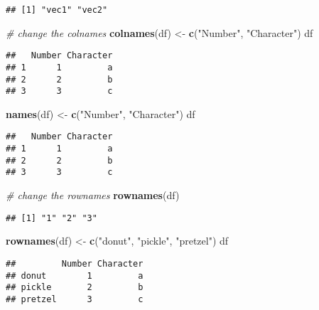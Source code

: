 \documentclass[
]{book}
\newenvironment{Shaded}{\begin{snugshade}}{\end{snugshade}}
\newcommand{\CommentTok}[1]{\textcolor[rgb]{0.56,0.35,0.01}{\textit{#1}}}
\newcommand{\KeywordTok}[1]{\textcolor[rgb]{0.13,0.29,0.53}{\textbf{#1}}}
\newcommand{\NormalTok}[1]{#1}
\newcommand{\StringTok}[1]{\textcolor[rgb]{0.31,0.60,0.02}{#1}}
\begin{document}
\begin{verbatim}
## [1] "vec1" "vec2"
\end{verbatim}

\begin{Shaded}
\begin{Highlighting}[]
\CommentTok{\# change the colnames}
\KeywordTok{colnames}\NormalTok{(df) \textless{}{-}}\StringTok{ }\KeywordTok{c}\NormalTok{(}\StringTok{"Number"}\NormalTok{, }\StringTok{"Character"}\NormalTok{)}
\NormalTok{df}
\end{Highlighting}
\end{Shaded}

\begin{verbatim}
##   Number Character
## 1      1         a
## 2      2         b
## 3      3         c
\end{verbatim}

\begin{Shaded}
\begin{Highlighting}[]
\KeywordTok{names}\NormalTok{(df) \textless{}{-}}\StringTok{ }\KeywordTok{c}\NormalTok{(}\StringTok{"Number"}\NormalTok{, }\StringTok{"Character"}\NormalTok{)}
\NormalTok{df}
\end{Highlighting}
\end{Shaded}

\begin{verbatim}
##   Number Character
## 1      1         a
## 2      2         b
## 3      3         c
\end{verbatim}

\begin{Shaded}
\begin{Highlighting}[]
\CommentTok{\# change the rownames}
\KeywordTok{rownames}\NormalTok{(df)}
\end{Highlighting}
\end{Shaded}

\begin{verbatim}
## [1] "1" "2" "3"
\end{verbatim}

\begin{Shaded}
\begin{Highlighting}[]
\KeywordTok{rownames}\NormalTok{(df) \textless{}{-}}\StringTok{ }\KeywordTok{c}\NormalTok{(}\StringTok{"donut"}\NormalTok{, }\StringTok{"pickle"}\NormalTok{, }\StringTok{"pretzel"}\NormalTok{)}
\NormalTok{df}
\end{Highlighting}
\end{Shaded}

\begin{verbatim}
##         Number Character
## donut        1         a
## pickle       2         b
## pretzel      3         c
\end{verbatim}
\end{document}
